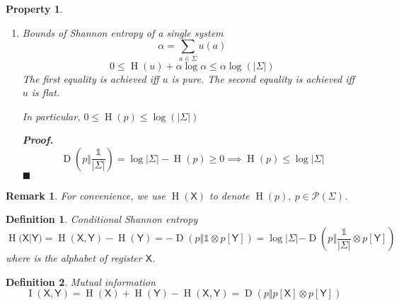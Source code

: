 \documentclass[aps,pra,onecolumn,notitlepage,superscriptaddress]{revtex4-1}
\newcommand{\reg}[1]{\mathsf{#1}}
\newcommand{\spc}[1]{\mathcal{#1}}
\newcommand{\op}[1]{\operatorname{#1}}
\newcommand\I{\mathds{1}}
\newtheorem{defi}{Definition}
\newtheorem{rem}{Remark}
\newtheorem{proper}{Property}
\def\Proof{{\bf Proof.~}}
\def\qed{$\blacksquare$ \newline}
\begin{document}
\begin{proper}
\begin{enumerate}
            \item Bounds of Shannon entropy of a single system
            \begin{equation}
                \alpha = \sum_{a \in \Sigma} u(a)
            \end{equation}
            \begin{equation}
                0 \leq \op H(u) + \alpha \log \alpha \leq \alpha \log (|\Sigma|)
            \end{equation}
            The first equality is achieved iff $u$ is pure. The second equality is achieved iff $u$ is flat.
            
            In particular, $0 \leq \op H(p) \leq \log(|\Sigma|)$
            
            \Proof
            \begin{equation}
                \op D(p \Vert \frac{\I}{|\Sigma|}) = \log |\Sigma|-\op H(p) \geq 0 \implies \op H(p) \leq \log |\Sigma|
            \end{equation}
            \qed
         \end{enumerate}
    \end{proper}

    \begin{rem}
        For convenience, we use $\op H(\reg X)$ to denote $\op H(p), \ p \in \spc P(\Sigma)$.
    \end{rem}

    \begin{defi}
        Conditional Shannon entropy
        \begin{equation}
            \op H(\reg X | \reg Y) = \op H(\reg X, \reg Y) - \op H(\reg Y) = -\op D(p \Vert \I \otimes p[\reg Y]) = \log |\Sigma| - \op D(p \Vert \frac{\I}{|\Sigma|} \otimes p[\reg Y])
        \end{equation}
        where  is the alphabet of register $\reg X$.
    \end{defi}
    \begin{defi}
        Mutual information
        \begin{equation}
            \op I(\reg X, \reg Y) = \op H(\reg X) + \op H(\reg Y) - \op H(\reg X, \reg Y) = \op D(p \Vert p[\reg X] \otimes p[\reg Y])
        \end{equation}
    \end{defi}
\end{document}
